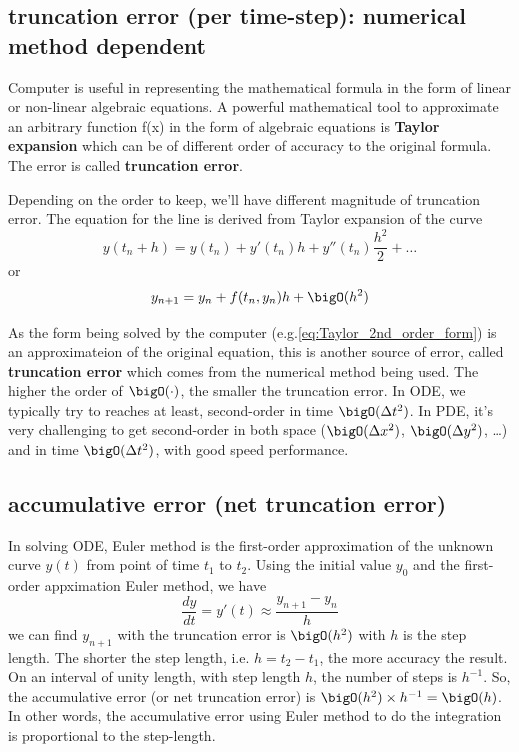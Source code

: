 \subsection{truncation error (per time-step): numerical method dependent}
\label{sec:truncation-error}

Computer is useful in representing the mathematical formula in the form of
linear or non-linear algebraic equations.
A powerful mathematical tool to approximate an arbitrary function f(x) in the
form of algebraic equations is {\bf Taylor expansion} which can be of different
order of accuracy to the original formula. The error is called {\bf truncation
error}.

Depending on the order to keep, we'll have different magnitude of truncation
error. The equation for the line is derived from Taylor expansion of the curve
\begin{equation}
y(t_n+h) = y(t_n)+ y'(t_n)h + y''(t_n)\frac{h^2}{2} + \ldots
\end{equation}
or
\begin{equation}
\label{eq:Taylor_2nd_order_form}
y_{n+1} = y_{n} + f(t_n, y_n) h + \bigO(h^2)
\end{equation}

As the form being solved by the computer (e.g.\ref{eq:Taylor_2nd_order_form}) is
an approximateion of the original equation, this is another source of error,
called {\bf truncation error} which comes from the numerical method being used.
The higher the order of $\bigO(\cdot)$, the smaller the truncation error. In
ODE, we typically try to reaches at least, second-order in time $\bigO(\Delta
t^2)$. In PDE, it's very challenging to get second-order in both space
($\bigO(\Delta x^2)$, $\bigO(\Delta y^2)$, \ldots) and in time 
$\bigO(\Delta t^2)$, with good speed performance.


\subsection{accumulative error (net truncation error)}
\label{sec:accumulative-error}
\label{sec:net-truncation-error}

In solving ODE, Euler method is the first-order approximation of the
unknown curve $y(t)$ from point of time $t_1$ to $t_2$. 
Using the initial value $y_0$ and the first-order appximation Euler method, we
have
\begin{equation}
\frac{dy}{dt} = y'(t) \approx \frac{y_{n+1}-y_n}{h} 
\end{equation}
we can find $y_{n+1}$ with the truncation error is $\bigO(h^2)$ with $h$ is the
step length. The shorter the step length, i.e. $h=t_2-t_1$, the more accuracy
the result. On an interval of unity length, with step length $h$, the number
of steps is $h^{-1}$. So, the accumulative error (or net truncation
error) is $\bigO(h^2) \times h^{-1} = \bigO(h)$. In other words, the
accumulative error using Euler method to do the integration is proportional to the step-length. 

